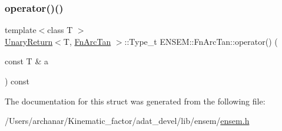 \mbox{\label{structENSEM_1_1FnArcTan_afb87d30d5f337130faf32e6af2c2669f}} 
\subsubsection{\texorpdfstring{operator()()}{operator()()}\hspace{0.1cm}{\footnotesize\ttfamily [2/2]}}
{\footnotesize\ttfamily template$<$class T $>$ \\
\mbox{\hyperlink{structENSEM_1_1UnaryReturn}{Unary\+Return}}$<$T, \mbox{\hyperlink{structENSEM_1_1FnArcTan}{Fn\+Arc\+Tan}} $>$\+::Type\+\_\+t E\+N\+S\+E\+M\+::\+Fn\+Arc\+Tan\+::operator() (\begin{DoxyParamCaption}\item[{const T \&}]{a }\end{DoxyParamCaption}) const\hspace{0.3cm}{\ttfamily [inline]}}



The documentation for this struct was generated from the following file\+:\begin{DoxyCompactItemize}
\item 
/\+Users/archanar/\+Kinematic\+\_\+factor/adat\+\_\+devel/lib/ensem/\mbox{\hyperlink{lib_2ensem_2ensem_8h}{ensem.\+h}}\end{DoxyCompactItemize}
